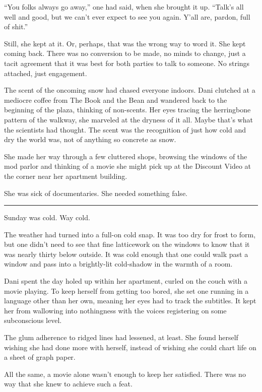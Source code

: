 ``You folks always go away,'' one had said, when she brought it up. ``Talk's all well and good, but we can't ever expect to see you again. Y'all are, pardon, full of shit.''

Still, she kept at it. Or, perhaps, that was the wrong way to word it. She kept coming back. There was no conversion to be made, no minds to change, just a tacit agreement that it was best for both parties to talk to someone. No strings attached, just engagement.

The scent of the oncoming snow had chased everyone indoors. Dani clutched at a mediocre coffee from The Book and the Bean and wandered back to the beginning of the plaza, thinking of non-scents. Her eyes tracing the herringbone pattern of the walkway, she marveled at the dryness of it all. Maybe that's what the scientists had thought. The scent was the recognition of just how cold and dry the world was, not of anything so concrete as snow.

She made her way through a few cluttered shops, browsing the windows of the mod parlor and thinking of a movie she might pick up at the Discount Video at the corner near her apartment building.

She was sick of documentaries. She needed something false.

\begin{center}\rule{0.5\linewidth}{\linethickness}\end{center}

Sunday was cold. Way cold.

The weather had turned into a full-on cold snap. It was too dry for frost to form, but one didn't need to see that fine latticework on the windows to know that it was nearly thirty below outside. It was cold enough that one could walk past a window and pass into a brightly-lit cold-shadow in the warmth of a room.

Dani spent the day holed up within her apartment, curled on the couch with a movie playing. To keep herself from getting too bored, she set one running in a language other than her own, meaning her eyes had to track the subtitles. It kept her from wallowing into nothingness with the voices registering on some subconscious level.

The glum adherence to ridged lines had lessened, at least. She found herself wishing she had done more with herself, instead of wishing she could chart life on a sheet of graph paper.

All the same, a movie alone wasn't enough to keep her satisfied. There was no way that she knew to achieve such a feat.

